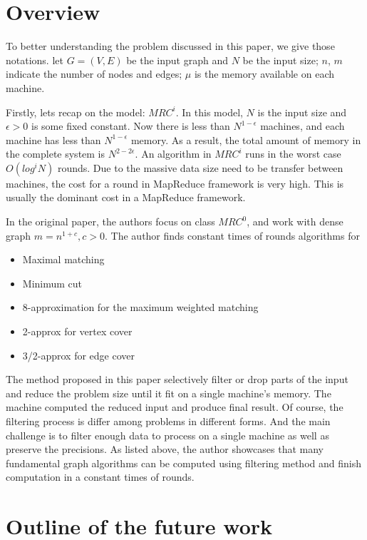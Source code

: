 \documentclass[a4paper,11pt]{article}
\begin{document}
\section{Overview}

To better understanding the problem discussed in this paper, we give those notations. let $G=(V,E)$ be the input graph and $N$ be the input size; $n$, $m$ indicate the number of nodes and edges; $\mu$ is the memory available on each machine. 

Firstly, lets recap on the model: $MRC^i$. In this model, $N$ is the input size and $\epsilon > 0$ is some fixed constant. Now there is less than $N^{1-\epsilon}$ machines, and each machine has less than $N^{1-\epsilon}$ memory. As a result, the total amount of memory in the complete system is $N^{2-2\epsilon}$. An algorithm in $MRC^i$ runs in the worst case $O(log^i N)$ rounds\cite{karloff2010MRCmodel}. Due to the massive data size need to be transfer between machines, the cost for a round in MapReduce framework is very high. This is usually the dominant cost in a MapReduce framework.

In the original paper, the authors focus on class $MRC^0$, and work with dense graph $m=n^{1+c}, c>0$. The author finds constant times of rounds algorithms for 
\begin{itemize}
  \item Maximal matching
  \item Minimum cut
  \item 8-approximation for the maximum weighted matching 
  \item 2-approx for vertex cover
  \item 3/2-approx for edge cover
\end{itemize}

The method proposed in this paper selectively filter or drop parts of the input and reduce the problem size until it fit on a single machine's memory. The machine computed the reduced input and produce final result. Of course, the filtering process is differ among problems in different forms. And the main challenge is to filter enough data to process on a single machine as well as preserve the precisions. As listed above, the author showcases that many fundamental graph algorithms can be computed using filtering method and finish computation in a constant times of rounds. 

\section{Outline of the future work}
\end{document}
